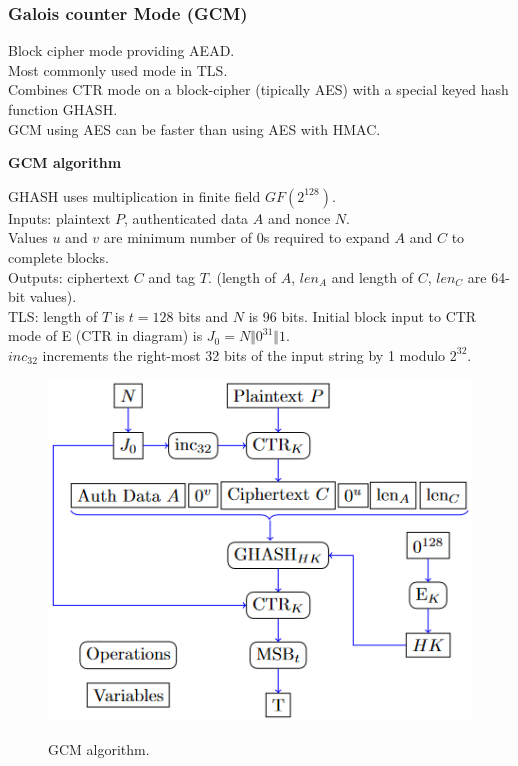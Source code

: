 \documentclass{article}
\begin{document}
\subsubsection{Galois counter Mode (GCM)}

Block cipher mode providing AEAD.\\
Most commonly used mode in TLS.\\
Combines CTR mode on a block-cipher (tipically AES) with a special keyed hash function GHASH.\\
GCM using AES can be faster than using AES with HMAC.

\textbf{GCM algorithm}

GHASH uses multiplication in finite field $GF(2^{128})$.\\
Inputs: plaintext $P$, authenticated data $A$ and nonce $N$.\\
Values $u$ and $v$ are minimum number of 0s required to expand $A$ and $C$ to complete blocks.\\
Outputs: ciphertext $C$ and tag $T$. (length of $A$, $len_A$ and length of $C$, $len_C$ are 64-bit values).\\
TLS: length of $T$ is $t=128$ bits and $N$ is 96 bits. Initial block input to CTR mode of E (CTR in diagram) is $J_0 = N \Vert 0^31 \Vert 1$.\\
$inc_{32}$ increments the right-most 32 bits of the input string by 1 modulo $2^{32}$.

\begin{figure}[H]
\centering
\includegraphics[scale=0.75]{Images/gcmalgorithm.png}
\label{fig:fround}
\caption{GCM algorithm.}
\end{figure}
\end{document}

